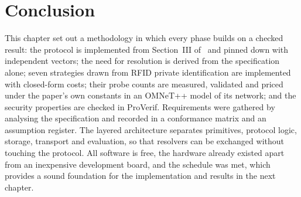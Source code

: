 \section{Conclusion}
This chapter set out a methodology in which every phase builds on a checked result: the protocol is implemented from Section~III of~\cite{base} and pinned down with independent vectors; the need for resolution is derived from the specification alone; seven strategies drawn from RFID private identification are implemented with closed-form costs; their probe counts are measured, validated and priced under the paper's own constants in an OMNeT++ model of its network; and the security properties are checked in ProVerif. Requirements were gathered by analysing the specification and recorded in a conformance matrix and an assumption register. The layered architecture separates primitives, protocol logic, storage, transport and evaluation, so that resolvers can be exchanged without touching the protocol. All software is free, the hardware already existed apart from an inexpensive development board, and the schedule was met, which provides a sound foundation for the implementation and results in the next chapter.
